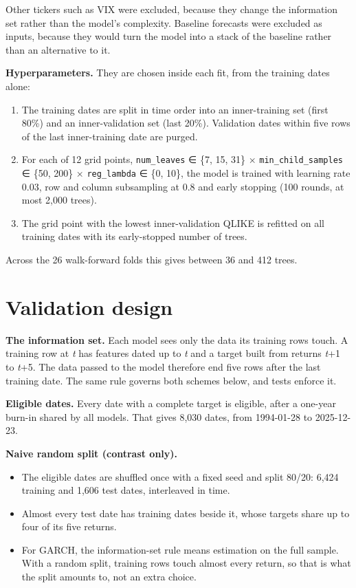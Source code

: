 \documentclass[11pt]{article}
\providecommand{\tightlist}{\setlength{\itemsep}{0pt}\setlength{\parskip}{0pt}}
\begin{document}
Other tickers such as VIX were excluded, because they change the
information set rather than the model's complexity. Baseline forecasts
were excluded as inputs, because they would turn the model into a stack of
the baseline rather than an alternative to it.

\textbf{Hyperparameters.} They are chosen inside each fit, from the training
dates alone:

\begin{enumerate}
\def\labelenumi{\arabic{enumi}.}
\tightlist
\item
  The training dates are split in time order into an inner-training set
  (first 80\%) and an inner-validation set (last 20\%). Validation dates
  within five rows of the last inner-training date are purged.
\item
  For each of 12 grid points, \texttt{num\_leaves} ∈ \{7, 15, 31\} ×
  \texttt{min\_child\_samples} ∈ \{50, 200\} × \texttt{reg\_lambda} ∈ \{0, 10\}, the model is
  trained with learning rate 0.03, row and column subsampling at 0.8 and
  early stopping (100 rounds, at most 2,000 trees).
\item
  The grid point with the lowest inner-validation QLIKE is refitted on
  all training dates with its early-stopped number of trees.
\end{enumerate}

Across the 26 walk-forward folds this gives between 36 and 412 trees.

\hypertarget{validation-design}{%
\section{Validation design}\label{validation-design}}

\textbf{The information set.} Each model sees only the data its training rows
touch. A training row at \emph{t} has features dated up to \emph{t} and a target
built from returns \emph{t}+1 to \emph{t}+5. The data passed to the model therefore
end five rows after the last training date. The same rule governs both
schemes below, and tests enforce it.

\textbf{Eligible dates.} Every date with a complete target is eligible, after a
one-year burn-in shared by all models. That gives 8,030 dates, from
1994-01-28 to 2025-12-23.

\textbf{Naive random split (contrast only).}

\begin{itemize}
\tightlist
\item
  The eligible dates are shuffled once with a fixed seed and split 80/20:
  6,424 training and 1,606 test dates, interleaved in time.
\item
  Almost every test date has training dates beside it, whose targets share
  up to four of its five returns.
\item
  For GARCH, the information-set rule means estimation on the full sample.
  With a random split, training rows touch almost every return, so that is
  what the split amounts to, not an extra choice.
\end{itemize}
\end{document}
